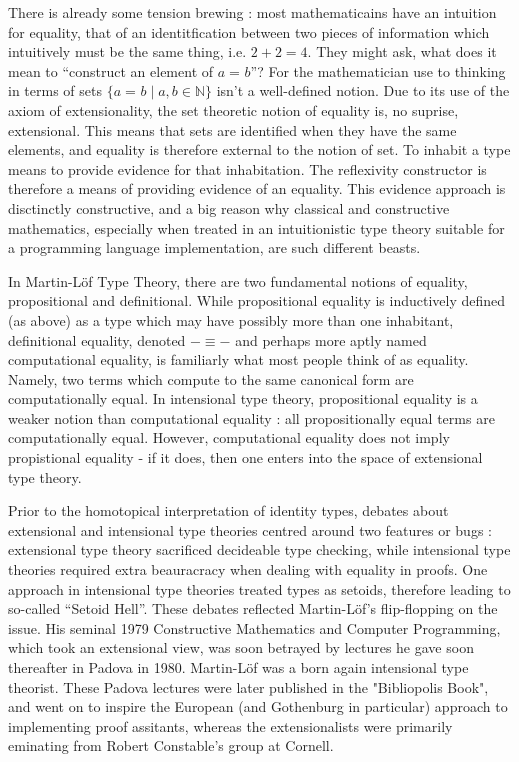 \documentclass[11pt, a4paper]{article}
\newcommand{\id}[3][]{\ensuremath{#2 =_{#1} #3}\xspace}
\begin{document}
There is already some tension brewing : most mathematicains have an intuition
for equality, that of an identitfication between two pieces of information
which intuitively must be the same thing, i.e. $2+2=4$. They might ask, what
does it mean to ``construct an element of $\id{a}{b}$''? For the mathematician
use to thinking in terms of sets $\{\id{a}{b} \mid a,b \in \mathbb{N} \}$ isn't
a well-defined notion. Due to its use of the axiom of extensionality, the set
theoretic notion of equality is, no suprise, extensional.  This means that sets
are identified when they have the same elements, and equality is therefore
external to the notion of set. To inhabit a type means to provide evidence for
that inhabitation. The reflexivity constructor is therefore a means of
providing evidence of an equality. This evidence approach is disctinctly
constructive, and a big reason why classical and constructive mathematics,
especially when treated in an intuitionistic type theory suitable for a
programming language implementation, are such different beasts.

In Martin-Löf Type Theory, there are two fundamental notions of equality,
propositional and definitional.  While propositional equality is inductively
defined (as above) as a type which may have possibly more than one inhabitant,
definitional equality, denoted $-\equiv -$ and perhaps more aptly named
computational equality, is familiarly what most people think of as equality.
Namely, two terms which compute to the same canonical form are computationally
equal. In intensional type theory, propositional equality is a weaker notion
than computational equality : all propositionally equal terms are
computationally equal. However, computational equality does not imply
propistional equality - if it does, then one enters into the space of
extensional type theory. 

Prior to the homotopical interpretation of identity types, debates about
extensional and intensional type theories centred around two features or bugs :
extensional type theory sacrificed decideable type checking, while intensional
type theories required extra beauracracy when dealing with equality in proofs.
One approach in intensional type theories treated types as setoids, therefore
leading to so-called ``Setoid Hell''. These debates reflected Martin-Löf's
flip-flopping on the issue. His seminal 1979 Constructive Mathematics and
Computer Programming, which took an extensional view, was soon betrayed by
lectures he gave soon thereafter in Padova in 1980.  Martin-Löf was a born
again intensional type theorist.  These Padova lectures were later published in
the "Bibliopolis Book", and went on to inspire the European (and Gothenburg in
particular) approach to implementing proof assitants, whereas the
extensionalists were primarily eminating from Robert Constable's group at
Cornell. 
\end{document}
